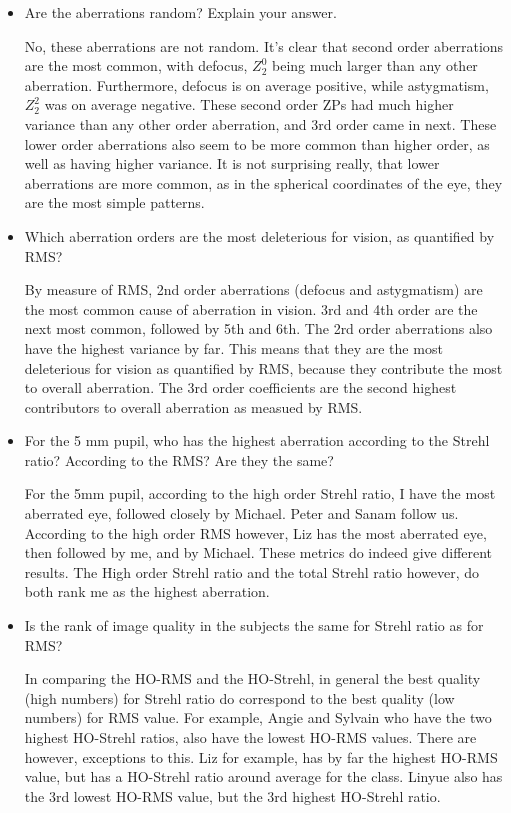 \documentclass{article}
\begin{document}
\begin{itemize}
\item Are the aberrations random? Explain your answer.

No, these aberrations are not random. It's clear that second order aberrations are the most common, with defocus, $Z_2^0$ being much larger than any other aberration. Furthermore, defocus is on average positive, while astygmatism, $Z_2^2$ was on average negative. These second order ZPs had much higher variance than any other order aberration, and 3rd order came in next. These lower order aberrations also seem to be more common than higher order, as well as having higher variance. It is not surprising really, that lower aberrations are more common, as in the spherical coordinates of the eye, they are the most simple patterns.

\item Which aberration orders are the most deleterious for vision, as quantified by
RMS?

By measure of RMS, 2nd order aberrations (defocus and astygmatism) are the most common cause of aberration in vision. 3rd and 4th order are the next most common, followed by 5th and 6th. The 2rd order aberrations also have the highest variance by far. This means that they are the most deleterious for vision as quantified by RMS, because they contribute the most to overall aberration. The 3rd order coefficients are the second highest contributors to overall aberration as measued by RMS.

\item For the 5 mm pupil, who has the highest aberration according to the Strehl ratio? According to the RMS? Are they the same?

For the 5mm pupil, according to the high order Strehl ratio, I have the most aberrated eye, followed closely by Michael. Peter and Sanam follow us. According to the high order RMS however, Liz has the most aberrated eye, then followed by me, and by Michael. These metrics do indeed give different results. The High order Strehl ratio and the total Strehl ratio however, do both rank me as the highest aberration.

\item Is the rank of image quality in the subjects the same for Strehl ratio as for RMS?

In comparing the HO-RMS and the HO-Strehl, in general the best quality (high numbers) for Strehl ratio do correspond to the best quality (low numbers) for RMS value. For example, Angie and Sylvain who have the two highest HO-Strehl ratios, also have the lowest HO-RMS values. There are however, exceptions to this. Liz for example, has by far the highest HO-RMS value, but has a HO-Strehl ratio around average for the class. Linyue also has the 3rd lowest HO-RMS value, but the 3rd highest HO-Strehl ratio.


\end{itemize}
\end{document}
